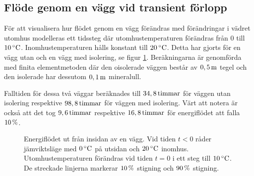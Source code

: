 \subsection{Flöde genom en vägg vid transient förlopp}


För att visualisera hur flödet genom en vägg förändras med
förändringar i vädret utomhus modelleras ett tidssteg där utomhustemperaturen förändras från 0 till $\unit[10]{^\circ C}$. Inomhustemperaturen hålls konstant till $\unit[20]{^\circ C}$. Detta har gjorts för en vägg utan och en vägg med isolering, se figur \ref{fig:energyflow_trans}. Beräkningarna är genomförda med finita elementmetoden där den oisolerade väggen består av $\unit[0,5]{m}$ tegel och den isolerade har dessutom $\unit[0,1]{m}$ mineralull.

Falltiden för dessa två väggar beräknades till $\unit[34,8]{timmar}$ för väggen utan isolering respektive $\unit[98,8]{timmar}$ för väggen med isolering. 
Värt att notera är också att det tog $\unit[9,6]{timmar}$ respektive $\unit[16,8]{timmar}$ för energiflödet att falla $\unit[10]{\%}$. 

\begin{figure}[hpbt]
\centering

\vspace{5mm}
\caption{\label{fig:energyflow_trans} Energiflödet ut från insidan av en vägg. Vid tiden $t<0$ råder jämviktsläge med $\unit[0]{^\circ C}$ på utsidan och $\unit[20]{^\circ C}$ inomhus. Utomhustemperaturen förändras vid tiden $t=0$ i ett steg till $\unit[10]{^\circ C}$. De streckade linjerna markerar $\unit[10]{\%}$ stigning och $\unit[90]{\%}$ stigning.}

\end{figure}

